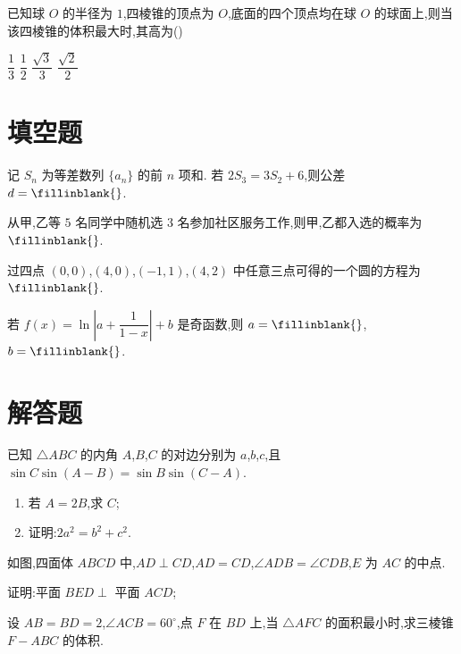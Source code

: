 \begin{problem}
已知球 \(O\) 的半径为 \(1\),四棱锥的顶点为 \(O\),底面的四个顶点均在球 \(O\) 的球面上,则当该四棱锥的体积最大时,其高为(\quad)

\choices
    {\(\dfrac{1}{3}\)}
    {\(\dfrac{1}{2}\)}
    {\(\dfrac{\sqrt3}{3}\)}
    {\(\dfrac{\sqrt2}{2}\)}
\end{problem}

\section{填空题}

\begin{problem}
记 \(S_n\) 为等差数列 \(\{a_n\}\) 的前 \(n\) 项和. 若 \(2S_3=3S_2+6\),则公差 \(d=\fillinblank{}\).
\end{problem}

\begin{problem}
从甲,乙等 \(5\) 名同学中随机选 \(3\) 名参加社区服务工作,则甲,乙都入选的概率为 \(\fillinblank{}\).
\end{problem}

\begin{problem}
过四点 \((0,0)\),\((4,0)\),\((-1,1)\),\((4,2)\) 中任意三点可得的一个圆的方程为 \(\fillinblank{}\).
\end{problem}

\begin{problem}
若 \(f(x)=\ln\left|a+\dfrac{1}{1-x}\right|+b\) 是奇函数,则 \(a=\fillinblank{}\),\(b=\fillinblank{}\).
\end{problem}

\section{解答题}

\begin{problem}
已知 \(\triangle ABC\) 的内角 \(A\),\(B\),\(C\) 的对边分别为 \(a\),\(b\),\(c\),且 \(\sin C\sin\left(A-B\right)=\sin B\sin\left(C-A\right)\).

\begin{enumerate}
\item 若 \(A=2B\),求 \(C\);
\item 证明:\(2a^2=b^2+c^2\).
\end{enumerate}
\end{problem}

\begin{problem}
如图,四面体 \(ABCD\) 中,\(AD\perp CD\),\(AD=CD\),\(\angle ADB=\angle CDB\),\(E\) 为 \(AC\) 的中点.

\begin{center}
\end{center}

 证明:平面 \(BED\perp\) 平面 \(ACD\);

 设 \(AB=BD=2\),\(\angle ACB=60^\circ\),点 \(F\) 在 \(BD\) 上,当 \(\triangle AFC\) 的面积最小时,求三棱锥 \(F-ABC\) 的体积.
\end{problem}

